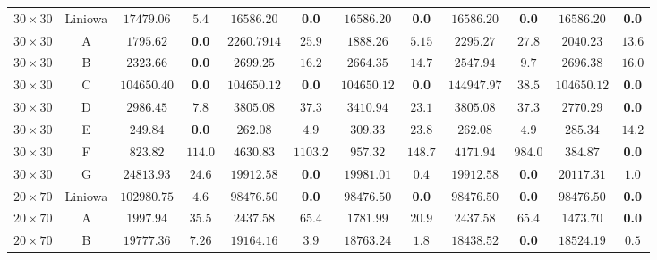 \begin{table}[H]
\begin{center}
{\begin{tabular}{c|c||c|c||c|c||c|c||c|c||c|c}
            \hline
            $30 \times 30$ & Liniowa     & $17479.06$ & $5.4$                    & $16586.20$ & \textbf{0.0}         & $16586.20$ & \textbf{0.0}        & $16586.20$ & \textbf{0.0}        & $16586.20$ & \textbf{0.0} \\
            $30 \times 30$ & A           & $1795.62$ & \textbf{0.0}                     & $2260.7914$ & $25.9$       & $1888.26$ & $5.15$        & $2295.27$ & $27.8$        & $2040.23$ & $13.6$ \\
            $30 \times 30$ & B           & $2323.66$ & \textbf{0.0}                     & $2699.25$ & $16.2$         & $2664.35$ & $14.7$        & $2547.94$ & $9.7$         & $2696.38$ & $16.0$ \\
            $30 \times 30$ & C           & $104650.40$ & \textbf{0.0}                   & $104650.12$ & \textbf{0.0}        & $104650.12$ & \textbf{0.0}       & $144947.97$ & $38.5$      & $104650.12$ & \textbf{0.0} \\
            $30 \times 30$ & D           & $2986.45$ & $7.8$                     & $3805.08$ & $37.3$         & $3410.94$ & $23.1$        & $3805.08$ & $37.3$        & $2770.29$ & \textbf{0.0} \\
            $30 \times 30$ & E           & $249.84$ & \textbf{0.0}                      & $262.08$ & $4.9$           & $309.33$ & $23.8$         & $262.08$ & $4.9$          & $285.34$ & $14.2$ \\
            $30 \times 30$ & F           & $823.82$ & $114.0$                    & $4630.83$ & $1103.2$       & $957.32$ & $148.7$        & $4171.94$ & $984.0$       & $384.87$ & \textbf{0.0} \\
            $30 \times 30$ & G           & $24813.93$ & $24.6$                   & $19912.58$ & \textbf{0.0}         & $19981.01$ & $0.4$        & $19912.58$ & \textbf{0.0}        & $20117.31$ & $1.0$ \\
            \hline
            $20 \times 70$ & Liniowa     & $102980.75$ & $4.6$                   & $98476.50$ & \textbf{0.0}         & $98476.50$ & \textbf{0.0}        & $98476.50$ & \textbf{0.0}        & $98476.50$ & \textbf{0.0} \\
            $20 \times 70$ & A           & $1997.94$ & $35.5$                    & $2437.58$ & $65.4$         & $1781.99$ & $20.9$        & $2437.58$ & $65.4$        & $1473.70$ & \textbf{0.0} \\
            $20 \times 70$ & B           & $19777.36$ & $7.26$                   & $19164.16$ & $3.9$         & $18763.24$ & $1.8$        & $18438.52$ & \textbf{0.0}        & $18524.19$ & $0.5$ \\

\end{tabular}}
\end{center}
\end{table}
